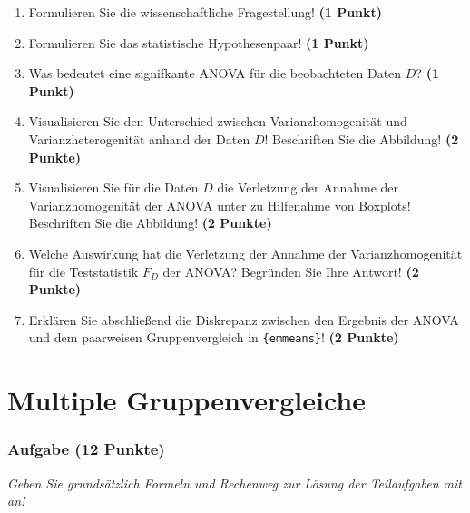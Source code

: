 \documentclass[a4paper, 9pt]{scrartcl}\usepackage[]{graphicx}\usepackage[]{xcolor}
\begin{document}
\begin{enumerate}
  \item Formulieren Sie die wissenschaftliche Fragestellung! \textbf{(1 Punkt)}
  \item Formulieren Sie das statistische Hypothesenpaar! \textbf{(1 Punkt)}
\item Was bedeutet eine signifkante ANOVA für die beobachteten Daten $D$? \textbf{(1 Punkt)}
\item Visualisieren Sie den Unterschied zwischen Varianzhomogenität und Varianzheterogenität anhand der Daten $D$! Beschriften Sie die Abbildung! \textbf{(2 Punkte)} 
\item Visualisieren Sie für die Daten $D$ die Verletzung der Annahme der Varianzhomogenität der ANOVA unter zu Hilfenahme von Boxplots! Beschriften Sie die Abbildung! \textbf{(2 Punkte)}
\item Welche Auswirkung hat die Verletzung der Annahme der Varianzhomogenität für die Teststatistik $F_D$ der ANOVA? Begründen Sie Ihre Antwort! \textbf{(2 Punkte)}
\item Erklären Sie abschließend die Diskrepanz zwischen den Ergebnis der ANOVA und dem paarweisen Gruppenvergleich in \texttt{\{emmeans\}}! \textbf{(2 Punkte)}
\end{enumerate}

 
\clearpage
\part{Multiple Gruppenvergleiche}

\section{Aufgabe \hfill (12 Punkte)}

\textit{Geben Sie grundsätzlich Formeln und Rechenweg zur Lösung der Teilaufgaben mit an!} \\[1Ex]
 
\end{document}
